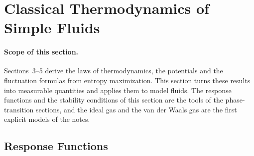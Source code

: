 %

\section{Classical Thermodynamics of Simple Fluids}

\paragraph{Scope of this section.}
Sections~3--5 derive the laws of thermodynamics, the potentials and the
fluctuation formulas from entropy maximization. This section turns these
results into measurable quantities and applies them to model fluids. The
response functions and the stability conditions of this section are the
tools of the phase-transition sections, and the ideal gas and the van der
Waals gas are the first explicit models of the notes.

\subsection{Response Functions}

